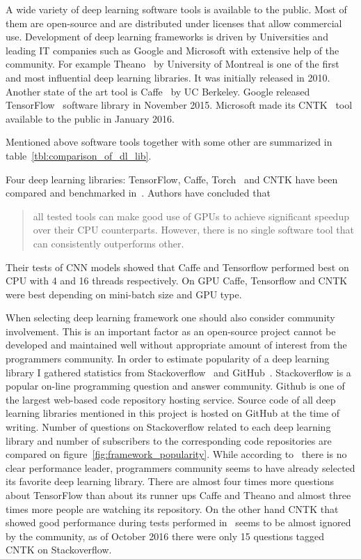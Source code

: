\documentclass[a4paper, 11pt, table]{article}
\begin{document}
A wide variety of deep learning software tools is available to the public. Most of them are open-source and are distributed under licenses that allow commercial use. Development of deep learning frameworks is driven by Universities and leading IT companies such as Google and Microsoft with extensive help of the community. For example Theano~\cite{2016arXiv160502688short} by University of Montreal is one of the first and most influential deep learning libraries. It was initially released in 2010. Another state of the art tool is Caffe~\cite{jia2014caffe} by UC Berkeley. Google released TensorFlow~\cite{tensorflow2015-whitepaper} software library in November 2015. Microsoft made its CNTK~\cite{cntk} tool available to the public in January 2016.

Mentioned above software tools together with some other are summarized in table~\ref{tbl:comparison_of_dl_lib}. 

Four deep learning libraries: TensorFlow, Caffe, Torch~\cite{Collobert_NIPSWORKSHOP_2011} and CNTK have been compared and benchmarked in~\cite{DBLP:journals/corr/ShiWXC16}. Authors have concluded that \blockquote{all tested tools can make good use of GPUs to achieve significant speedup over their CPU counterparts. However, there is  no  single  software  tool  that  can  consistently  outperforms other.} Their tests of CNN models showed that Caffe and Tensorflow performed best on CPU with 4 and 16 threads respectively. On GPU Caffe, Tensorflow and CNTK were best depending on mini-batch size and GPU type. 

When selecting deep learning framework one should also consider community involvement. This is an important factor as an open-source project cannot be developed and maintained well without appropriate amount of interest from the programmers community. In order to estimate popularity of a deep learning library I gathered statistics from Stackoverflow~\cite{Mamykina:2011:DLF:1978942.1979366} and GitHub~\cite{Thung:2013:NSS:2495256.2495709}. Stackoverflow is a popular on-line programming question and answer community. Github is one of the largest web-based code repository hosting service. Source code of all deep learning libraries mentioned in this project is hosted on GitHub at the time of writing. Number of questions on Stackoverflow related to each deep learning library and number of subscribers to the corresponding code repositories are compared on figure~\ref{fig:framework_popularity}. While according to~\cite{DBLP:journals/corr/ShiWXC16} there is no clear performance leader, programmers community seems to have already selected its favorite deep learning library. There are almost four times more questions about TensorFlow than about its runner ups Caffe and Theano and almost three times more people are watching its repository. On the other hand CNTK that showed good performance during tests performed in~\cite{DBLP:journals/corr/ShiWXC16} seems to be almost ignored by the community, as of October 2016 there were only 15 questions tagged CNTK on Stackoverflow. 
\end{document}
